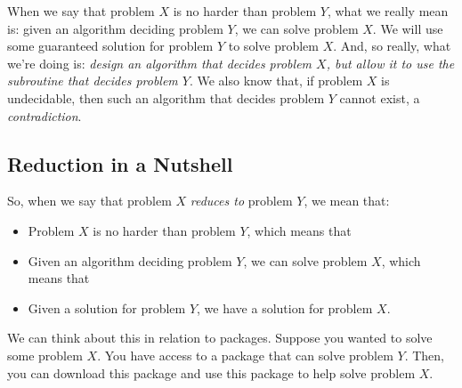 \documentclass[letterpaper]{article}
\begin{document}
When we say that problem $X$ is no harder than problem $Y$, what we really mean is: given an algorithm deciding problem $Y$, we can solve problem $X$. We will use some guaranteed solution for problem $Y$ to solve problem $X$. And, so really, what we're doing is: \emph{design an algorithm that decides problem $X$, but allow it to use the subroutine that decides problem $Y$}. We also know that, if problem $X$ is undecidable, then such an algorithm that decides problem $Y$ cannot exist, a \emph{contradiction}.



\subsection{Reduction in a Nutshell}
So, when we say that problem $X$ \emph{reduces to} problem $Y$, we mean that: 
\begin{itemize}
    \item Problem $X$ is no harder than problem $Y$, which means that 
    \item Given an algorithm deciding problem $Y$, we can solve problem $X$, which means that 
    \item Given a solution for problem $Y$, we have a solution for problem $X$. 
\end{itemize}
We can think about this in relation to packages. Suppose you wanted to solve some problem $X$. You have access to a package that can solve problem $Y$. Then, you can download this package and use this package to help solve problem $X$. 
\end{document}
